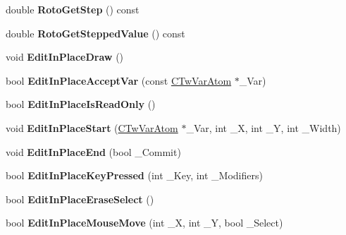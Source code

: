 \begin{DoxyCompactItemize}
\item 
\hypertarget{struct_c_tw_bar_abc612c704a5986cc5a6b38e17745793c}{double {\bfseries Roto\+Get\+Step} () const }\label{struct_c_tw_bar_abc612c704a5986cc5a6b38e17745793c}

\item 
\hypertarget{struct_c_tw_bar_a6ec1aa5512881bc9eb4c4e5723a6b76f}{double {\bfseries Roto\+Get\+Stepped\+Value} () const }\label{struct_c_tw_bar_a6ec1aa5512881bc9eb4c4e5723a6b76f}

\item 
\hypertarget{struct_c_tw_bar_a6b1eadad8001bb0937f784bdc65c02bc}{void {\bfseries Edit\+In\+Place\+Draw} ()}\label{struct_c_tw_bar_a6b1eadad8001bb0937f784bdc65c02bc}

\item 
\hypertarget{struct_c_tw_bar_a7cfcb4582414cfde27bef3fa6fa22cf0}{bool {\bfseries Edit\+In\+Place\+Accept\+Var} (const \hyperlink{struct_c_tw_var_atom}{C\+Tw\+Var\+Atom} $\ast$\+\_\+\+Var)}\label{struct_c_tw_bar_a7cfcb4582414cfde27bef3fa6fa22cf0}

\item 
\hypertarget{struct_c_tw_bar_a8c334a90a6a94f38e43ba0b20dde49b3}{bool {\bfseries Edit\+In\+Place\+Is\+Read\+Only} ()}\label{struct_c_tw_bar_a8c334a90a6a94f38e43ba0b20dde49b3}

\item 
\hypertarget{struct_c_tw_bar_a278cff1f7216f9b3d6b4da2d2602aea1}{void {\bfseries Edit\+In\+Place\+Start} (\hyperlink{struct_c_tw_var_atom}{C\+Tw\+Var\+Atom} $\ast$\+\_\+\+Var, int \+\_\+\+X, int \+\_\+\+Y, int \+\_\+\+Width)}\label{struct_c_tw_bar_a278cff1f7216f9b3d6b4da2d2602aea1}

\item 
\hypertarget{struct_c_tw_bar_ac836c33de6f54035712fb188774672a8}{void {\bfseries Edit\+In\+Place\+End} (bool \+\_\+\+Commit)}\label{struct_c_tw_bar_ac836c33de6f54035712fb188774672a8}

\item 
\hypertarget{struct_c_tw_bar_a659f9b097d03979e0539e05869511403}{bool {\bfseries Edit\+In\+Place\+Key\+Pressed} (int \+\_\+\+Key, int \+\_\+\+Modifiers)}\label{struct_c_tw_bar_a659f9b097d03979e0539e05869511403}

\item 
\hypertarget{struct_c_tw_bar_a08249256e2f2e4936127063adfbfbe2f}{bool {\bfseries Edit\+In\+Place\+Erase\+Select} ()}\label{struct_c_tw_bar_a08249256e2f2e4936127063adfbfbe2f}

\item 
\hypertarget{struct_c_tw_bar_aee7496c9e7b1531b91b7c328dc5020a9}{bool {\bfseries Edit\+In\+Place\+Mouse\+Move} (int \+\_\+\+X, int \+\_\+\+Y, bool \+\_\+\+Select)}\label{struct_c_tw_bar_aee7496c9e7b1531b91b7c328dc5020a9}


\end{DoxyCompactItemize}

